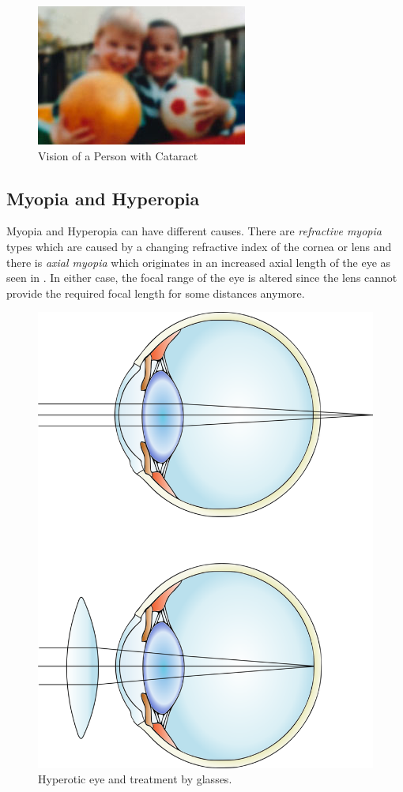 \documentclass{sig-alternate-05-2015}
\begin{document}
\begin{figure}
    \centering
    \includegraphics[width=\columnwidth]{cataractvision.png}
    \caption{Vision of a Person with Cataract}
    \label{fig:cataract}
\end{figure}

\subsection{Myopia and Hyperopia}

Myopia and Hyperopia can have different causes. There are \emph{refractive myopia} types which are caused by a changing refractive index of the cornea or lens and there is \emph{axial myopia} which originates in an increased axial length of the eye as seen in .
In either case, the focal range of the eye is altered since the lens cannot provide the required focal length for some distances anymore.

\begin{figure}
    \centering
    \includegraphics[width=0.75\columnwidth]{hyperopia.png}
    \caption{Hyperotic eye and treatment by glasses.}
    \label{fig:hyperopia}
\end{figure}
\end{document}
